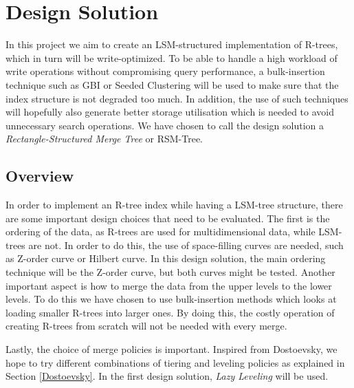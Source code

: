 \chapter{Design Solution}
\label{chap:design}
In this project we aim to create an LSM-structured implementation of R-trees, which in turn will be write-optimized. To be able to handle a high workload of write operations without compromising query performance, a bulk-insertion technique such as GBI\cite{GBI} or Seeded Clustering\cite{SeededClustering} will be used to make sure that the index structure is not degraded too much. In addition, the use of such techniques will hopefully also generate better storage utilisation which is needed to avoid unnecessary search operations. We have chosen to call the design solution a \emph{Rectangle-Structured Merge Tree} or RSM-Tree.

\section{Overview}
In order to implement an R-tree index while having a LSM-tree structure, there are some important design choices that need to be evaluated. The first is the ordering of the data, as R-trees are used for multidimensional data, while LSM-trees are not. In order to do this, the use of space-filling curves are needed, such as Z-order curve or Hilbert curve. In this design solution, the main ordering technique will be the Z-order curve, but both curves might be tested. Another important aspect is how to merge the data from the upper levels to the lower levels. To do this we have chosen to use bulk-insertion methods which looks at loading smaller R-trees into larger ones. By doing this, the costly operation of creating R-trees from scratch will not be needed with every merge.\newline

\noindent
Lastly, the choice of merge policies is important. Inspired from Dostoevsky\cite{Dostoevsky}, we hope to try different combinations of tiering and leveling policies as explained in Section \ref{Dostoevsky}. In the first design solution, \emph{Lazy Leveling} will be used.  

